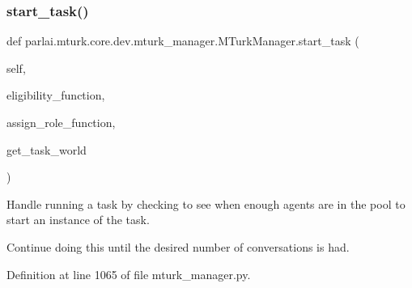 \subsubsection{\texorpdfstring{start\+\_\+task()}{start\_task()}}
{\footnotesize\ttfamily def parlai.\+mturk.\+core.\+dev.\+mturk\+\_\+manager.\+M\+Turk\+Manager.\+start\+\_\+task (\begin{DoxyParamCaption}\item[{}]{self,  }\item[{}]{eligibility\+\_\+function,  }\item[{}]{assign\+\_\+role\+\_\+function,  }\item[{}]{get\+\_\+task\+\_\+world }\end{DoxyParamCaption})}

\begin{DoxyVerb}Handle running a task by checking to see when enough agents are in the pool to
start an instance of the task.

Continue doing this until the desired number of conversations is had.
\end{DoxyVerb}
 

Definition at line 1065 of file mturk\+\_\+manager.\+py.


